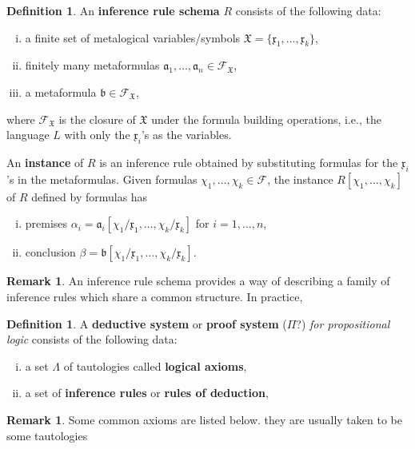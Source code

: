 \documentclass[12pt]{article}
\theoremstyle{definition}
\newtheorem{definition}[theorem]{Definition}
\newtheorem{remark}[theorem]{Remark}
\newcommand{\<}{\langle}
\renewcommand{\>}{\rangle}
\newcommand{\FF}{\mathcal{F}}
\newcommand{\aaa}{\mathfrak{a}}
\newcommand{\XXX}{\mathfrak{X}}
\newcommand{\xxx}{\mathfrak{x}}
\newcommand{\keyword}{\textbf}
\begin{document}
\begin{definition}
    An \keyword{inference rule schema} $R$ consists of the following data:
    \begin{enumerate}[(i)]
        \item a finite set of metalogical variables/symbols $\XXX  = \{\xxx_1, \dots, \xxx_k\}$,
        \item finitely many metaformulas $\aaa_1, \dots, \aaa_n \in \FF_\XXX$,
        \item a metaformula $\mathfrak{b} \in \FF_\XXX$,
    \end{enumerate}
    where $\FF_\XXX$ is the closure of $\XXX$ under the formula building operations, i.e., the language $L$ with only the $\xxx_i$'s as the variables.

    An \keyword{instance} of $R$ is an inference rule obtained by substituting formulas for the $\xxx_i$'s in the metaformulas.
    Given formulas $\chi_1, \dots, \chi_k \in \FF$, the instance $R[\chi_1, \dots, \chi_k]$ of $R$ defined by formulas  has
    \begin{enumerate}[(i)]
        \item premises $\alpha_i = \aaa_i[\chi_1/\xxx_1, \dots, \chi_k/\xxx_k]$ for $i = 1, \dots, n$,
        \item conclusion $\beta = \mathfrak{b}[\chi_1/\xxx_1, \dots, \chi_k/\xxx_k]$.
    \end{enumerate}
\end{definition}

\begin{remark}
    An inference rule schema provides a way of describing a family of inference rules which share a common structure.
    In practice, 
\end{remark}

\begin{definition}
    A \keyword{deductive system} or \keyword{proof system} ($\Pi$?) \emph{for propositional logic} consists of the following data:
    \begin{enumerate}[(i)]
        \item a set $\Lambda$ of tautologies called \keyword{logical axioms},
        \item a set of \keyword{inference rules} or \keyword{rules of deduction},
    \end{enumerate}
\end{definition}

\begin{remark}
    Some common axioms are listed below. they are usually taken to be some tautologies
\end{remark}
\end{document}
